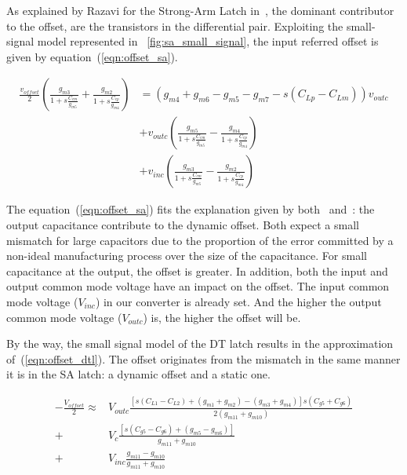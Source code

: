 As explained by Razavi for the Strong-Arm Latch in~\cite{Razavi2015}, the dominant contributor to the offset, are the transistors in the differential pair. Exploiting the small-signal model represented in \figurename~\ref{fig:sa_small_signal}, the input referred offset is given by equation~(\ref{eqn:offset_sa}).

\begin{align}
    \label{eqn:offset_sa}
    \frac{v_{offset}}{2} \left( \frac{g_{m3}}{1+s\frac{C_{cm}}{g_{m5}}} + \frac{g_{m2}}{1+s\frac{C_{cp}}{g_{m4}}} \right) &= \left( g_{m4}+g_{m6}-g_{m5}-g_{m7}-s\left(C_{Lp}-C_{Lm}\right) \right) v_{outc} \\
    &+ v_{outc} \left( \frac{g_{m5}}{1+s\frac{C_{cm}}{g_{m5}}} - \frac{g_{m4}}{1+s\frac{C_{cp}}{g_{m4}}} \right) \nonumber \\
    &+ v_{inc} \left( \frac{g_{m3}}{1+s\frac{C_{cm}}{g_{m5}}} - \frac{g_{m2}}{1+s\frac{C_{cp}}{g_{m4}}} \right) \nonumber
\end{align}

The equation~(\ref{eqn:offset_sa}) fits the explanation  given by both~\cite{Razavi2015} and~\cite{Abidi2014}: the output capacitance contribute to the dynamic offset. Both expect a small mismatch for large capacitors due to the proportion of the error committed by a non-ideal manufacturing process over the size of the capacitance. For small capacitance at the output, the offset is greater. In addition, both the input and output common mode voltage have an impact on the offset. The input common mode voltage (\(V_{inc}\)) in our converter is already set. And the higher the output common mode voltage (\(V_{outc}\)) is, the higher the offset will be.

By the way, the small signal model of the DT latch results in the approximation of~(\ref{eqn:offset_dtl}). The offset originates from the mismatch in the same manner it is in the SA latch: a dynamic offset and a static one.

\begin{align}
\label{eqn:offset_dtl}
-\frac{V_{offset}}{2} \approx & V_{outc}\frac{\left[s \left(C_{L1} - C_{L2}\right) + \left(g_{m1}+g_{m2}\right) -\left(g_{m3}+g_{m4}\right)\right] s \left(C_{g5} + C_{g6}\right)}{2(g_{m11}+g_{m10})}\\
+ & V_c \frac{\left[s \left(C_{g5}-C_{g6}\right) + \left(g_{m5}-g_{m6}\right)\right]}{g_{m11}+g_{m10}}  \nonumber  \\
+ & V_{inc}\frac{g_{m11}-g_{m10}}{g_{m11}+g_{m10}} \nonumber 
\end{align}

